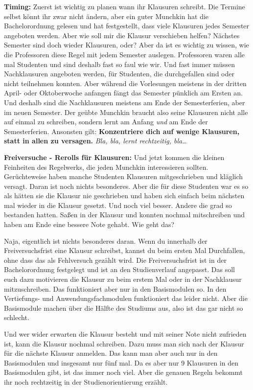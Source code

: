 \textbf{Timing:}
Zuerst ist wichtig zu planen wann ihr Klausuren schreibt.
Die Termine selbst k\"onnt ihr zwar nicht \"andern, aber ein guter Munchkin hat die Bachelorordnung gelesen
und hat festgestellt, dass viele Klausuren jedes Semester angeboten werden. Aber wie soll mir die Klausur verschieben helfen?
N\"achstes Semester sind doch wieder Klausuren, oder? Aber da ist es wichtig
zu wissen, wie die Professoren diese Regel mit jedem Semester auslegen.
Professoren waren alle mal Studenten und sind deshalb fast so faul wie wir.
Und fast immer m\"ussen Nachklausuren angeboten werden, f\"ur Studenten, die durchgefallen sind oder nicht teilnehmen konnten.
Aber w\"ahrend die Vorlesungen meistens in der dritten April- oder Oktoberwoche anfangen f\"angt das Semester p\"unklich am Ersten an.
Und deshalb sind die Nachklausuren meistens am Ende der Semesterferien, aber im neuen Semester. Der
ge\"ubte Munchkin braucht also seine Klausuren nicht alle auf einmal zu
schreiben, sondern lernt am Anfang \emph{und} am Ende der Semesterferien.
Ansonsten gilt: \textbf{Konzentriere dich auf wenige Klausuren, statt in allen zu versagen.}
\emph{Bla, bla, lernt rechtzeitig, bla\dots}

\textbf{Freiversuche - Rerolls f\"ur Klausuren:}
Und jetzt kommen die kleinen Feinheiten des Regelwerks, die jeden Munchkin interessieren sollten.
Ger\"uchteweise haben manche Studenten Klausuren mitgeschrieben und kl\"aglich versagt. Daran ist noch nichts besonderes.
Aber die f\"ur diese Studenten war es so als h\"atten sie die Klausur nie
geschrieben und haben sich einfach beim n\"achsten mal wieder in die Klausur
gesetzt. Und noch viel besser. Andere die grad so bestanden hatten. Sa{\ss}en
in der Klausur und konnten nochmal mitschreiben und haben am Ende eine bessere
Note gehabt. Wie geht das?

Naja, eigentlich ist nichts besonderes daran. Wenn du innerhalb der
Freiversuchsfrist eine Klausur schreibst, kannst du beim ersten Mal
Durchfallen, ohne dass das als Fehlversuch gez\"ahlt wird.
Die Freiversuchsfrist ist in der Bachelorordnung festgelegt und ist an den Studienverlauf angepasst.
Das soll euch dazu motivieren die Klausur zu beim erstem Mal oder in der Nachklausur mitzuschreiben.
Das funktioniert aber nur in den Basismodulen so. In den Vertiefungs- und Anwendungsfachmodulen funktioniert das leider nicht.
Aber die Basismodule machen \"uber die H\"alfte des Studiums aus, also ist das gar nicht so schlecht.

Und wer wider erwarten die Klausur besteht und mit seiner Note nicht zufrieden
ist, kann die Klausur nochmal schreiben. Dazu muss man sich nach der Klausur
f\"ur die n\"achste Klausur anmelden. Das kann man aber auch nur in den
Basismodulen und insgesamt nur f\"unf mal. Da es aber nur 9 Klausuren in den Basismodulen gibt,
ist das immer noch viel. Aber die genauen Regeln bekommt ihr noch rechtzeitig in der Studienorientierung erz\"ahlt.

